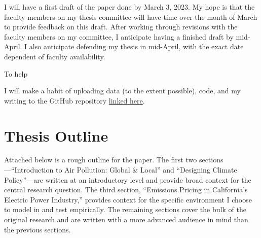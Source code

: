 \documentclass[11pt]{article}
\begin{document}
I will have a first draft of the paper done by March 3, 2023. My hope is that the faculty members on my thesis committee will have time over the month of March to provide feedback on this draft. After working through revisions with the faculty members on my committee, I anticipate having a finished draft by mid-April. I also anticipate defending my thesis in mid-April, with the exact date dependent of faculty availability. 

To help 

I will make a habit of uploading data (to the extent possible), code, and my writing to the GitHub repository \href{https://www.google.com/}{linked here}. 

\newpage
\section*{Thesis Outline}

Attached below is a rough outline for the paper. The first two sections---``Introduction to Air Pollution: Global \& Local'' and ``Designing Climate Policy''---are written at an introductory level and provide broad context for the central research question. The third section, ``Emissions Pricing in California's Electric Power Industry,'' provides context for the specific environment I choose to model in and test empirically. The remaining sections cover the bulk of the original research and are written with a more advanced audience in mind than the previous sections. 
\end{document}
